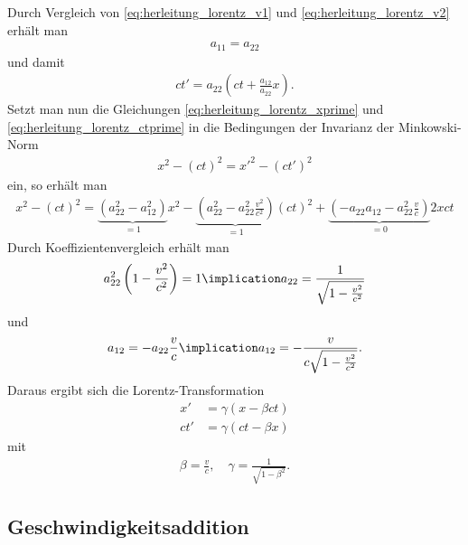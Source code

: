 Durch Vergleich von \eqref{eq:herleitung_lorentz_v1} und \eqref{eq:herleitung_lorentz_v2} erhält man
\begin{align*}
    a_{11}=a_{22}
\end{align*}
und damit
\begin{align}
    \label{eq:herleitung_lorentz_ctprime}
    ct'=a_{22}\left(ct+\frac{a_{12}}{a_{22}}x\right).
\end{align}
Setzt man nun die Gleichungen \eqref{eq:herleitung_lorentz_xprime} und \eqref{eq:herleitung_lorentz_ctprime} in die Bedingungen der Invarianz der Minkowski-Norm
\begin{align*}
    x^2-(ct)^2 = {x'}^2-(ct')^2
\end{align*}
ein, so erhält man
\begin{align*}
    x^2-(ct)^2 = \underbrace{\left(a_{22}^2-a_{12}^2\right)}_{=1}x^2 - \underbrace{\left(a_{22}^2-a_{22}^2 \frac{v^2}{c^2}\right)}_{=1}(ct)^2 + \underbrace{\left(-a_{22}a_{12}-a_{22}^2 \frac{v}{c}\right)}_{=0}2xct
\end{align*}
Durch Koeffizientenvergleich erhält man
\begin{align*}
    a_{22}^2 \left(1-\frac{v^2}{c^2}\right) = 1 \implication a_{22} = \frac{1}{\sqrt{1-\frac{v^2}{c^2}}}
\end{align*}
und
\begin{align*}
    a_{12} = -a_{22} \frac{v}{c} \implication a_{12} = -\frac{v}{c \sqrt{1-\frac{v^2}{c^2}}}.
\end{align*}
Daraus ergibt sich die Lorentz-Transformation
\begin{align*}
    x'  & = \gamma(x-\beta ct)  \\
    ct' & = \gamma(ct- \beta x)
\end{align*}
mit
\begin{align*}
    \beta=\frac{v}{c}, \quad \gamma=\frac{1}{\sqrt{1-\beta^2}}.
\end{align*}




\subsection{Geschwindigkeitsaddition}

